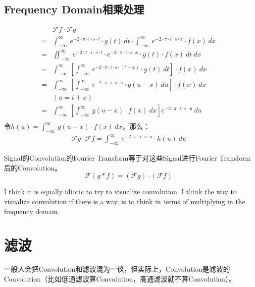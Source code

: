 \subsection{Frequency Domain相乘处理}
\begin{align*}
	  & \mathcal{F}f\cdot \mathcal{F}g                                                                                                                               \\
	= & \int_{-\infty}^{\infty}\ e^{-2\cdot \pi\cdot i\cdot s\cdot t}\cdot g(t)\ dt\cdot \int_{-\infty}^{\infty}\ e^{-2\cdot \pi\cdot i\cdot s\cdot x}\cdot f(x)\ dx \\
	= & \iint_{-\infty}^{\infty}\ e^{-2\cdot \pi\cdot i\cdot s\cdot t}\cdot e^{-2\cdot \pi\cdot i\cdot s\cdot x}\cdot g(t)\cdot f(x)\ dt\ dx                         \\
	= & \int_{-\infty}^{\infty}\ [\int_{-\infty}^{\infty}\ e^{-2\cdot \pi\cdot i\cdot s\cdot (t+x)}\cdot g(t)\ dt]\cdot f(x)\ dx                                     \\
	= & \int_{-\infty}^{\infty}\ [\int_{-\infty}^{\infty}\ e^{-2\cdot \pi\cdot i\cdot s\cdot u}\cdot g(u-x)\ du]\cdot f(x)\ dx                                       \\
	  & (u=t+x)                                                                                                                                                      \\
	= & \int_{-\infty}^{\infty}\ [\int_{-\infty}^{\infty}\ g(u-x)\cdot f(x)\ dx]e^{-2\cdot \pi\cdot i\cdot s\cdot u}\ du                                             \\
\end{align*}
令$h(u)=\int_{-\infty}^{\infty}\ g(u-x)\cdot f(x)\ dx$，那么：
\begin{align*}
	\mathcal{F}g\cdot \mathcal{F}f=\int_{-\infty}^{\infty}\ e^{-2\cdot \pi\cdot i\cdot s\cdot u}\cdot h(u)\ du
\end{align*}

Signal的Convolution的Fourier Transform等于对这些Signal进行Fourier Transform后的Convolution。
\begin{equation}
	\mathcal{F}(g*f)=(\mathcal{F}g)\cdot(\mathcal{F}f)
\end{equation}

I think it is equally idiotic to try to visualize convolution. I think the way to visualize convolution if there is a way, is to think in terms of multiplying in the frequency domain.
\section{滤波}
一般人会把Convolution和滤波混为一谈，但实际上，Convolution是滤波的Convolution（比如低通滤波算Convolution，高通滤波就不算Convolution）。
